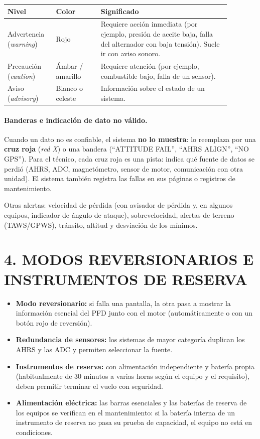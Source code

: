 \begin{center}
\small
\begin{tabular}{|p{0.18\linewidth}|p{0.18\linewidth}|p{0.52\linewidth}|}
\hline
\textbf{Nivel} & \textbf{Color} & \textbf{Significado} \\ \hline
Advertencia (\textit{warning}) & Rojo & Requiere acción inmediata (por ejemplo, presión de aceite
baja, falla del alternador con baja tensión). Suele ir con aviso sonoro. \\ \hline
Precaución (\textit{caution}) & Ámbar / amarillo & Requiere atención (por ejemplo, combustible
bajo, falla de un sensor). \\ \hline
Aviso (\textit{advisory}) & Blanco o celeste & Información sobre el estado de un sistema. \\ \hline
\end{tabular}
\end{center}

\paragraph*{Banderas e indicación de dato no válido.} Cuando un dato no es confiable, el sistema
\textbf{no lo muestra}: lo reemplaza por una \textbf{cruz roja} (\textit{red X}) o una bandera
(``ATTITUDE FAIL'', ``AHRS ALIGN'', ``NO GPS''). Para el técnico, cada cruz roja es una pista: indica
qué fuente de datos se perdió (AHRS, ADC, magnetómetro, sensor de motor, comunicación con otra
unidad). El sistema también registra las fallas en sus páginas o registros de mantenimiento.

Otras alertas: velocidad de pérdida (con avisador de pérdida y, en algunos equipos, indicador de
ángulo de ataque), sobrevelocidad, alertas de terreno (TAWS/GPWS), tránsito, altitud y
desviación de los mínimos.

\section*{4. MODOS REVERSIONARIOS E INSTRUMENTOS DE RESERVA}

\begin{itemize}
  \item \textbf{Modo reversionario:} si falla una pantalla, la otra pasa a mostrar la información
        esencial del PFD junto con el motor (automáticamente o con un botón rojo de reversión).
  \item \textbf{Redundancia de sensores:} los sistemas de mayor categoría duplican los AHRS y las
        ADC y permiten seleccionar la fuente.
  \item \textbf{Instrumentos de reserva:} con alimentación independiente y batería propia
        (habitualmente de 30 minutos a varias horas según el equipo y el requisito), deben permitir
        terminar el vuelo con seguridad.
  \item \textbf{Alimentación eléctrica:} las barras esenciales y las baterías de reserva de los
        equipos se verifican en el mantenimiento: si la batería interna de un instrumento de reserva
        no pasa su prueba de capacidad, el equipo no está en condiciones.
\end{itemize}

